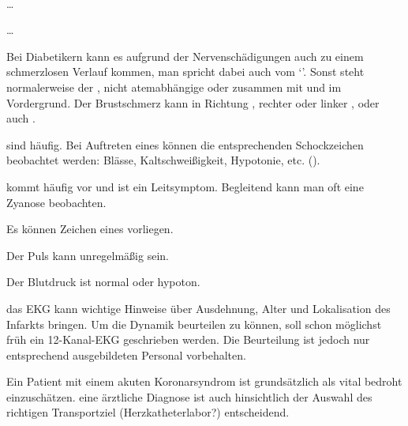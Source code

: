 \documentclass[
ngerman,
paper=a4,
asymmetric,
fontsize=10pt,
draft=false,
numbers=noenddot,
bibtotocnumbered,
footnotes=multiple,
]{scrreprt}
\begin{document}
{\TxABCDE}
{~
\begin{ABCDEText}
  \item[\ABCDE{3}]  \ldots
  \item[\ABCDE{4}] \ldots
   
   Bei Diabetikern kann es aufgrund der Nervenschädigungen
   auch zu einem schmerzlosen Verlauf kommen, man spricht
   dabei auch vom \enquote*{}.
  Sonst steht normalerweise der ,
  nicht atemabhängige  oder
   zusammen mit  und
   im Vordergrund. Der Brustschmerz kann in
  Richtung , rechter oder linker ,
   oder auch  .
   
    sind
   häufig.
   Bei Auftreten eines  können die
   entsprechenden Schockzeichen beobachtet werden: Blässe,
   Kaltschweißigkeit, Hypotonie, etc.
   ().
   \item[\ABCDE{B}]  kommt häufig vor und ist ein
   Leitsymptom.  Begleitend kann man oft eine Zyanose
   beobachten.
  \item[\ABCDE{C}] Es können Zeichen eines  vorliegen. 
   
   Der Puls kann unregelmäßig sein.
  \item[\ABCDE{D}]  Der Blutdruck ist normal oder hypoton.
  \item[\ABCDE{E}]  das EKG kann wichtige Hinweise über
   Ausdehnung, Alter und Lokalisation des Infarkts bringen.
   Um die Dynamik beurteilen zu können, soll schon möglichst
  früh ein 12-Kanal-EKG geschrieben werden. Die
  Beurteilung ist jedoch nur entsprechend ausgebildeten
  Personal vorbehalten.
   \item[\ABCDE{=}]  Ein Patient mit einem  akuten
   Koronarsyndrom ist grundsätzlich als vital bedroht
   einzuschätzen. eine ärztliche Diagnose ist auch
   hinsichtlich der Auswahl des richtigen Transportziel
   (Herzkatheterlabor?) entscheidend.
 \end{ABCDEText}
 }
 {
 \begin{ABCDESlide}
  \item[\ABCDE{3}] 
  \item[\ABCDE{4}] 
  \item[\ABCDE{B}] 
  \item[\ABCDE{C}] 
  \item[\ABCDE{D}] 
  \item[\ABCDE{E}] 
  \item[\ABCDE{=}] 
 \end{ABCDESlide}
 }
\end{document}
